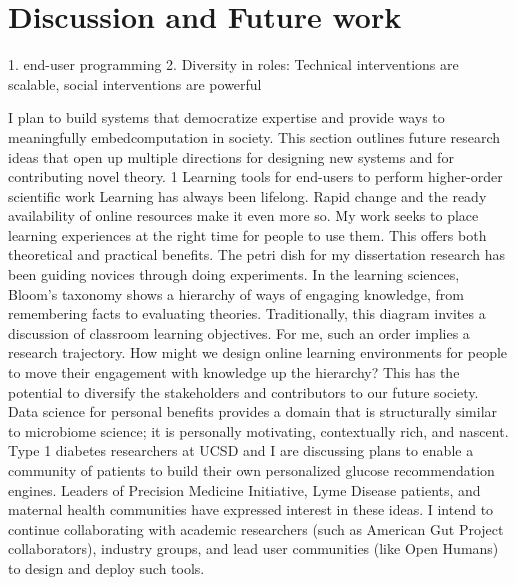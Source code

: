 
\chapter{Discussion and Future work}

1. end-user programming 
2. Diversity in roles: Technical interventions are scalable, social interventions are powerful

I plan to build systems that democratize expertise and provide ways to meaningfully embedcomputation in society. This section outlines future research ideas that open up multiple directions for designing new systems and for contributing novel theory. 1 Learning tools for end-users to perform higher-order scientific work Learning has always been lifelong. Rapid change and the ready availability of online resources make it even more so. My work seeks to place learning experiences at the right time for people to use them. This offers both theoretical and practical benefits. The petri dish for my dissertation research has been guiding novices through doing experiments. In the learning sciences, Bloom’s taxonomy shows a hierarchy of ways of engaging knowledge, from remembering facts to evaluating theories. Traditionally, this diagram invites a discussion of classroom learning objectives. For me, such an order implies a research trajectory. How might we design online learning environments for people to move their engagement with knowledge up the hierarchy? This has the potential to diversify the stakeholders and contributors to our future society. Data science for personal benefits provides a domain that is structurally similar to microbiome science; it is personally motivating, contextually rich, and nascent. Type 1 diabetes researchers at UCSD and I are discussing plans to enable a community of patients to build their own personalized glucose recommendation engines. Leaders of Precision Medicine Initiative, Lyme Disease patients, and maternal health communities have expressed interest in these ideas. I intend to continue collaborating with academic researchers (such as American Gut Project collaborators), industry groups, and lead user communities (like Open Humans) to design and deploy such tools.

